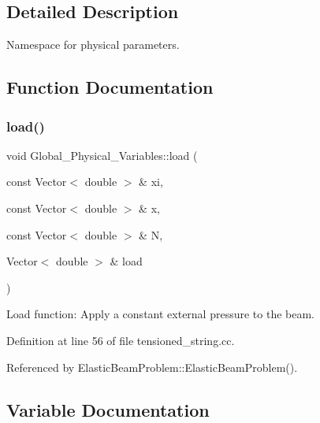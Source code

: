 \subsection{Detailed Description}
Namespace for physical parameters. 

\subsection{Function Documentation}
\mbox{\label{namespaceGlobal__Physical__Variables_a321267e1efb30b5d586302509354fb07}} 
\subsubsection{\texorpdfstring{load()}{load()}}
{\footnotesize\ttfamily void Global\+\_\+\+Physical\+\_\+\+Variables\+::load (\begin{DoxyParamCaption}\item[{const Vector$<$ double $>$ \&}]{xi,  }\item[{const Vector$<$ double $>$ \&}]{x,  }\item[{const Vector$<$ double $>$ \&}]{N,  }\item[{Vector$<$ double $>$ \&}]{load }\end{DoxyParamCaption})}



Load function\+: Apply a constant external pressure to the beam. 



Definition at line 56 of file tensioned\+\_\+string.\+cc.



Referenced by Elastic\+Beam\+Problem\+::\+Elastic\+Beam\+Problem().



\subsection{Variable Documentation}
\mbox{\label{namespaceGlobal__Physical__Variables_af6e07423e22c0991084d9a2f43727805}} 
